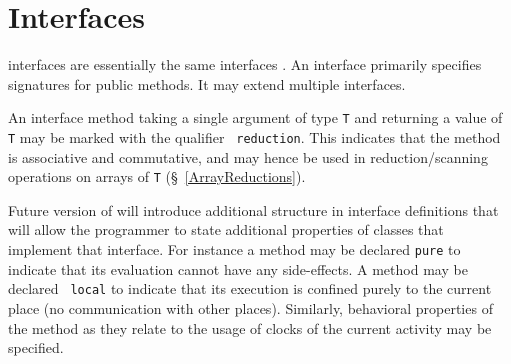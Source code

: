 \chapter{Interfaces}
\label{XtenInterfaces}

{}\XtenCurrVer{} interfaces are essentially the same \java{}
interfaces \cite[\S 9]{jls2}. An interface primarily specifies
signatures for public methods. It may extend multiple interfaces. 

An interface method taking a single argument of type {\tt T} and
returning a value of {\tt T} may be marked with the qualifier {\tt
reduction}. This indicates that the method is associative and
commutative, and may hence be used in reduction/scanning operations on
arrays of {\tt T} (\S~\ref{ArrayReductions}).\label{ReductionOperator}

Future version of \Xten{} will introduce additional structure in
interface definitions that will allow the programmer to state
additional properties of classes that implement that interface. For
instance a method may be declared {\tt pure} to indicate that its
evaluation cannot have any side-effects. A method may be declared {\tt
local} to indicate that its execution is confined purely to the
current place (no communication with other places). Similarly,
behavioral properties of the method as they relate to the usage of
clocks of the current activity may be specified.

